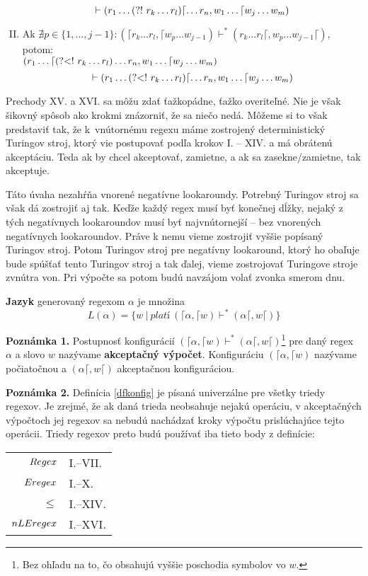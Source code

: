 \begin{df}
\begin{enumerate}[I.]
$$\vdash (r_1\dots \text{(?!~} r_{k}\dots r_{l} ) \lceil\dots r_n, w_1\dots \lceil w_j \dots w_m)$$
\item Ak $\nexists p \in \lbrace 1,\dots,j-1\rbrace: (\lceil r_k\dots r_l,\lceil w_p\dots w_{j-1}) \vdash^* (r_k\dots r_l\lceil, w_p \dots w_{j-1} \lceil)$, potom:
\\$\displaystyle{(r_1\dots\lceil \text{(?\textless !~}r_{k}\dots r_{l} ) \dots r_n, w_1\dots \lceil w_j \dots w_m)}$
$$\vdash (r_1\dots \text{(?\textless !~} r_{k}\dots r_{l} ) \lceil\dots r_n, w_1\dots \lceil w_j \dots w_m)$$
\end{enumerate}

\end{df}

Prechody XV. a XVI. sa môžu zdať ťažkopádne, ťažko overiteľné. Nie je však šikovný spôsob ako krokmi znázorniť, že sa niečo nedá. Môžeme si to však predstaviť tak, že k~vnútornému regexu máme zostrojený deterministický Turingov stroj, ktorý vie postupovať podľa krokov I. -- XIV. a má obrátenú akceptáciu. Teda ak by chcel akceptovať, zamietne, a ak sa zasekne/zamietne, tak akceptuje.

Táto úvaha nezahŕňa vnorené negatívne lookaroundy. Potrebný Turingov stroj sa však dá zostrojiť aj tak. Keďže každý regex musí byť konečnej dĺžky, nejaký z tých negatívnych lookaroundov musí byť najvnútornejší -- bez vnorených negatívnych look\-aroundov. Práve k nemu vieme zostrojiť vyššie popísaný Turingov stroj. Potom Turingov stroj pre negatívny lookaround, ktorý ho obaľuje bude spúšťať tento Turingov stroj a tak ďalej, vieme zostrojovať Turingove stroje zvnútra von. Pri výpočte sa potom budú navzájom volať zvonka smerom dnu.

\begin{df}
\textbf{Jazyk} generovaný regexom $\alpha$ je množina $$L(\alpha) = \lbrace w~|~platí ~ (\lceil \alpha, \lceil w)\vdash^* (\alpha\lceil, w\lceil) \rbrace$$
\end{df}

\textbf{Poznámka 1.}
Postupnosť konfigurácií $(\lceil \alpha, \lceil w)\vdash^* (\alpha\lceil, w\lceil)$\footnote{Bez ohľadu na to, čo obsahujú vyššie poschodia symbolov vo $w$.} pre daný regex $\alpha$ a slovo $w$ nazývame \textbf{akceptačný výpočet}. Konfiguráciu $(\lceil \alpha,\lceil w)$ nazývame počiatočnou a $(\alpha\lceil,w\lceil)$ akceptačnou konfiguráciou.

\textbf{Poznámka 2.}
Definícia \ref{dfkonfig} je písaná univerzálne pre všetky triedy regexov. Je zrejmé, že ak daná trieda neobsahuje nejakú operáciu, v akceptačných výpočtoch jej regexov sa nebudú nachádzať kroky výpočtu prislúchajúce tejto operácii. Triedy regexov preto budú používať iba tieto body z definície:
\begin{center}
\begin{tabular}{r|l}
$Regex$ & I.--VII. \\
$Eregex$ & I.--X. \\
$\le$ & I.--XIV. \\
$nLEregex$ & I.--XVI.
\end{tabular}
\end{center}

